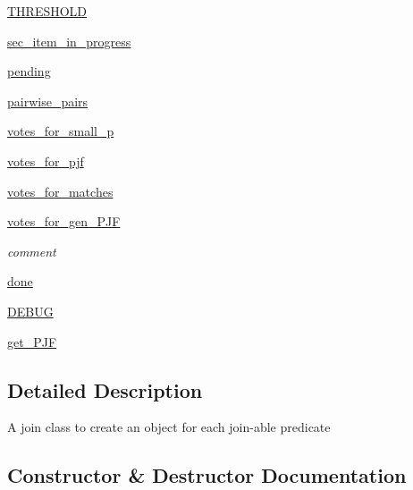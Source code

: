 \begin{DoxyCompactItemize}
\mbox{\hyperlink{classdynamicfilterapp_1_1models_1_1_join_a961b71469dafbf4908b0a7cd19e7f04c}{T\+H\+R\+E\+S\+H\+O\+LD}}
\item 
\mbox{\hyperlink{classdynamicfilterapp_1_1models_1_1_join_a7b60c5a3450732ea72b3cfee8f87449d}{sec\+\_\+item\+\_\+in\+\_\+progress}}
\item 
\mbox{\hyperlink{classdynamicfilterapp_1_1models_1_1_join_a2c37cdb35688296b995164b1b0142240}{pending}}
\item 
\mbox{\hyperlink{classdynamicfilterapp_1_1models_1_1_join_ae4cce95db1dcc5f19be6454337d96841}{pairwise\+\_\+pairs}}
\item 
\mbox{\hyperlink{classdynamicfilterapp_1_1models_1_1_join_a91816c1a011f3dfb47698f5313575446}{votes\+\_\+for\+\_\+small\+\_\+p}}
\item 
\mbox{\hyperlink{classdynamicfilterapp_1_1models_1_1_join_a54728e18d83bf4fb8232f87482dacd65}{votes\+\_\+for\+\_\+pjf}}
\item 
\mbox{\hyperlink{classdynamicfilterapp_1_1models_1_1_join_a37ebe7382290ac568bf48292decfecd4}{votes\+\_\+for\+\_\+matches}}
\item 
\mbox{\hyperlink{classdynamicfilterapp_1_1models_1_1_join_ad71de0d05082c97b065e5b6680d9bb9f}{votes\+\_\+for\+\_\+gen\+\_\+\+P\+JF}}
\begin{DoxyCompactList}\small\item\em comment \end{DoxyCompactList}\item 
\mbox{\hyperlink{classdynamicfilterapp_1_1models_1_1_join_ad604cff3eb5d475cdc9f8eb5ab570fee}{done}}
\item 
\mbox{\hyperlink{classdynamicfilterapp_1_1models_1_1_join_a73585d7121de037cf2e2ca12b27eb83e}{D\+E\+B\+UG}}
\item 
\mbox{\hyperlink{classdynamicfilterapp_1_1models_1_1_join_a30fc551c8a3a3bd30563a9464754246b}{get\+\_\+\+P\+JF}}
\end{DoxyCompactItemize}


\subsection{Detailed Description}
\begin{DoxyVerb}A join class to create an object for each join-able predicate \end{DoxyVerb}
 

\subsection{Constructor \& Destructor Documentation}
\mbox{\label{classdynamicfilterapp_1_1models_1_1_join_a7564097a16dcabdffeaa80d067a31af1}} 
